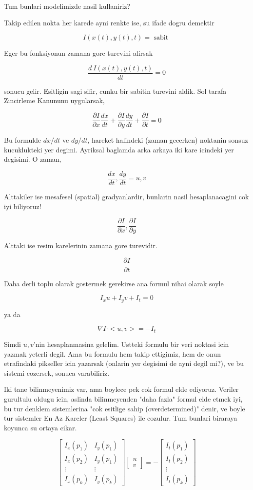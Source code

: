 \documentclass[12pt,fleqn]{article}\usepackage{../common}
\begin{document}
Tum bunlari modelimizde nasil kullaniriz? 

Takip edilen nokta her karede ayni renkte ise, su ifade dogru demektir 

$$ I(x(t),y(t),t) = \textrm{ sabit } $$

Eger bu fonksiyonun zamana gore turevini alirsak

$$ \frac{d \ I(x(t),y(t),t)}{dt} = 0$$

sonucu gelir. Esitligin sagi sifir, cunku bir sabitin turevini aldik. Sol
tarafa Zincirleme Kanununu uygularsak, 

$$ \frac{\partial I}{\partial x}\frac{dx}{dt} +
\frac{\partial I}{\partial y}\frac{dy}{dt} +
\frac{\partial I}{\partial t} = 0
$$

Bu formulde $dx/dt$ ve $dy/dt$, hareket halindeki (zaman gecerken) noktanin
sonsuz kucuklukteki yer degimi. Ayriksal baglamda arka arkaya iki kare
icindeki yer degisimi. O zaman,

$$ \frac{dx}{dt}, \frac{dy}{dt} = u, v $$

Alttakiler ise mesafesel (spatial) gradyanlardir, bunlarin nasil
hesaplanacagini cok iyi biliyoruz! 

$$ 
\frac{\partial I}{\partial x}, \frac{\partial I}{\partial y}
 $$

Alttaki ise resim karelerinin zamana gore turevidir.

$$ 
\frac{\partial I}{\partial t}
 $$

Daha derli toplu olarak gostermek gerekirse ana formul nihai olarak soyle

$$ I_x u + I_y v + I_t = 0 $$

ya da

$$ 
\nabla I \cdot <u, v> = -I_t
 $$

Simdi $u,v$'nin hesaplanmasina gelelim. Ustteki formulu bir veri noktasi
icin yazmak yeterli degil. Ama bu formulu hem takip ettigimiz, hem de onun
etrafindaki pikseller icin yazarsak (onlarin yer degisimi de ayni degil
mi?), ve bu sistemi cozersek, sonuca varabiliriz. 

Iki tane bilinmeyenimiz var, ama boylece pek cok formul elde
ediyoruz. Veriler gurultulu oldugu icin, aslinda bilinmeyenden "daha
fazla" formul elde etmek iyi, bu tur denklem sistemlerina "cok esitlige
sahip (overdetermined)" denir, ve boyle tur sistemler En Az Kareler (Least
Squares) ile cozulur. Tum bunlari biraraya koyunca su ortaya cikar.

$$ 
\left[\begin{array}{cc}
I_x(p_1) & I_y(p_1) \\
I_x(p_2) & I_y(p_1) \\
\vdots & \vdots \\
I_x(p_k) & I_y(p_k) 
\end{array}\right]
\left[\begin{array}{r}
u \\
v
\end{array}\right] = 
-
\left[\begin{array}{c}
I_t(p_1) \\
I_t(p_2) \\
\vdots \\
I_t(p_k) 
\end{array}\right]
 $$
\end{document}
